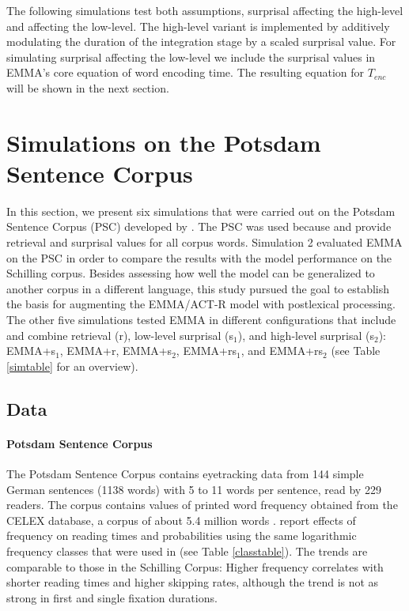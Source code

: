 The following simulations test both assumptions, surprisal affecting the  high-level and affecting the  low-level.  The high-level variant is implemented by additively modulating the duration of the integration stage by a scaled surprisal value. For simulating surprisal affecting the low-level we include the surprisal values in EMMA's core equation of word encoding time. The resulting equation for $T_{enc}$ will be shown in the next section.

\section{Simulations on the Potsdam Sentence Corpus} \label{sec:topics:psc}

In this section, we present six simulations that were carried out on the Potsdam Sentence Corpus (PSC) developed by \cite{Kliegl2004}. The PSC was used because \cite{Boston2008} and \cite{BostonHaleVasishth2011} provide retrieval and surprisal values for all corpus words.  Simulation 2 evaluated EMMA on the PSC in order to compare the results with the model performance on the Schilling corpus.  Besides assessing how well the model can be generalized to another corpus in a different language, this study pursued the goal to establish the basis for augmenting the EMMA/ACT-R model with postlexical processing. 
The other five simulations tested EMMA in different configurations that include and combine retrieval (r), low-level surprisal (s$_1$), and high-level surprisal (s$_2$): EMMA+s$_1$, EMMA+r, EMMA+s$_2$, EMMA+rs$_1$, and EMMA+rs$_2$ (see Table \ref{simtable} for an overview).

\subsection{Data}
\paragraph{Potsdam Sentence Corpus}
The Potsdam Sentence Corpus contains eyetracking data from 144 simple German sentences (1138 words) with 5 to 11 words per sentence, read by 229 readers. 
The corpus contains values of printed word frequency obtained from the  CELEX database, a corpus of about 5.4 million words \citep{Baayen1993}.
\cite{Kliegl2004} report effects of frequency on reading times and probabilities using the same logarithmic frequency classes that were used in \cite{Salvucci2001} (see Table \ref{classtable}). The trends are comparable to those in the  Schilling Corpus: Higher frequency correlates with shorter reading times and higher skipping rates, although the trend is not as strong in first and single fixation durations. 

